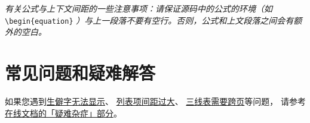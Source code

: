 \textit{有关公式与上下文间距的一些注意事项：请保证源码中的公式的环境（如}
\\ \verb|\begin{equation}|
\textit{）与上一段落不要有空行。否则，公式和上文段落之间会有额外的空白。}


\section{常见问题和疑难解答}

如果您遇到\href{https://bithesis.bitnp.net/faq/char-missing.html}{生僻字无法显示}、
\href{https://bithesis.bitnp.net/faq/enumitem-nosep.html}{列表项间距过大}、
\href{https://bithesis.bitnp.net/faq/longtable.html}{三线表需要跨页}等问题，
请参考\textcolor{magenta}{\href{https://bithesis.bitnp.net/faq/}{在线文档的「疑难杂症」部分}}。
